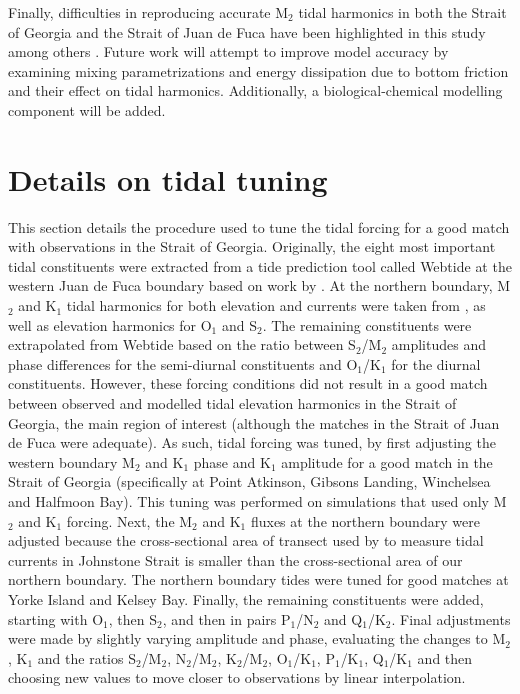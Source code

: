 \documentclass[letterpaper]{tATO2e}
\begin{document}
Finally, difficulties in reproducing accurate M$_2$ tidal harmonics in both the Strait of Georgia and the Strait of Juan de Fuca have been highlighted in this study among others \citep{stronach1993update, foreman2004m}. Future work will attempt to improve model accuracy by examining mixing parametrizations and energy dissipation due to bottom friction and their effect on tidal harmonics. Additionally, a biological-chemical modelling component will be added. 





\appendices
\section{Details on tidal tuning}\label{sec:appendix}
This section details the procedure used to tune the tidal forcing for a good match with observations in the Strait of Georgia. Originally, the eight most important tidal constituents were extracted from a tide prediction tool called Webtide \citep{webtide} at the western Juan de Fuca boundary based on work by \citet{foreman2000webtide}. At the northern boundary,  M$_2$ and K$_1$ tidal harmonics for both elevation and currents were taken from \citet{thomson1980johnstone}, as well as elevation harmonics for O$_1$ and S$_2$. The remaining constituents were extrapolated from Webtide based on the ratio between S$_2$/M$_2$ amplitudes and phase differences for the semi-diurnal constituents and O$_1$/K$_1$ for the diurnal constituents. However, these forcing conditions did not result in a good match between observed and modelled tidal elevation harmonics in the Strait of Georgia, the main region of interest (although the matches in the Strait of Juan de Fuca were adequate). As such, tidal forcing was tuned, by first adjusting the western boundary M$_2$ and K$_1$ phase and K$_1$ amplitude for a good match in the Strait of Georgia (specifically at Point Atkinson, Gibsons Landing, Winchelsea and Halfmoon Bay). This tuning was performed on simulations that used only M$_2$ and K$_1$ forcing. Next, the M$_2$ and K$_1$ fluxes at the northern boundary were adjusted because the cross-sectional area of transect used by \citet{thomson1980johnstone} to measure tidal currents in Johnstone Strait is smaller than the cross-sectional area of our northern boundary. {\color{red} The northern boundary tides were tuned for good matches at Yorke Island  and Kelsey Bay.} Finally, the remaining constituents were added, starting with O$_1$, then S$_2$, and then in pairs P$_1$/N$_2$ and Q$_1$/K$_2$. Final adjustments were made by slightly varying amplitude and phase, evaluating the changes to M$_2$, K$_1$ and the ratios S$_2$/M$_2$, N$_2$/M$_2$, K$_2$/M$_2$, O$_1$/K$_1$, P$_1$/K$_1$, Q$_1$/K$_1$ and then choosing new values to move closer to observations by linear interpolation. 
\end{document}
